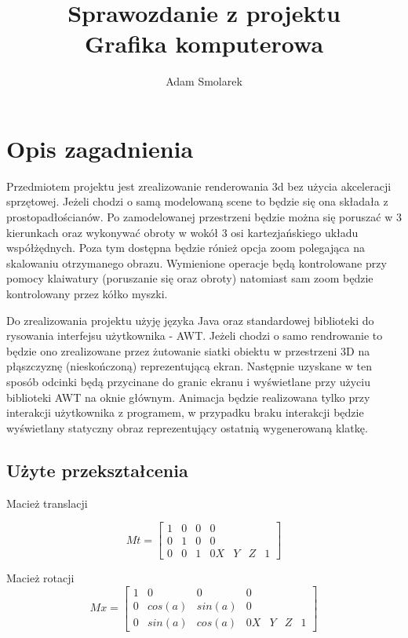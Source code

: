 \documentclass{article}
\begin{document}
\title{Sprawozdanie z projektu\\ Grafika komputerowa}
\author{Adam Smolarek}

\maketitle

\section{Opis zagadnienia}
Przedmiotem projektu jest zrealizowanie renderowania 3d bez użycia akceleracji sprzętowej. Jeżeli chodzi o samą modelowaną scene to będzie się ona składała z prostopadłościanów. Po zamodelowanej przestrzeni będzie można się poruszać w 3 kierunkach oraz wykonywać obroty w wokół 3 osi kartezjańskiego układu współżędnych. Poza tym dostępna będzie rónież opcja zoom polegająca na skalowaniu otrzymanego obrazu. Wymienione operacje będą kontrolowane przy pomocy klaiwatury (poruszanie się oraz obroty) natomiast sam zoom będzie kontrolowany przez kółko myszki. 

Do zrealizowania projektu użyję języka Java oraz standardowej biblioteki do rysowania interfejsu użytkownika - AWT. Jeżeli chodzi o samo rendrowanie to będzie ono zrealizowane przez żutowanie siatki obiektu w przestrzeni 3D na płąszczyznę (nieskończoną) reprezentującą ekran. Następnie uzyskane w ten sposób odcinki będą przycinane do granic ekranu i wyświetlane przy użyciu biblioteki AWT na oknie głównym. Animacja będzie realizowana tylko przy interakcji użytkownika z programem, w przypadku braku interakcji będzie wyświetlany statyczny obraz reprezentujący ostatnią wygenerowaną klatkę.

\subsection{Użyte przekształcenia}
Macież translacji

\[
Mt = \begin{bmatrix}
       1 & 0 & 0 & 0 \\[0.3em]
       0 & 1 & 0 & 0 \\[0.3em]
       0 & 0 & 1 & 0
       X & Y & Z & 1
     \end{bmatrix}
\]


Macież rotacji
\[
 Mx = \begin{bmatrix}
       1 & 0 & 0 & 0 \\[0.3em]
       0 & cos(a) & sin(a) & 0 \\[0.3em]
       0 & sin(a) & cos(a) & 0
       X & Y & Z & 1
     \end{bmatrix}
\]
\end{document}

